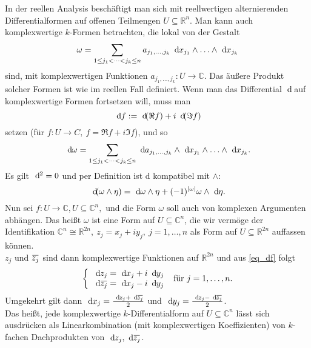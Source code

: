 \documentclass[a4paper,12pt]{book}
\theoremstyle{newthm}
\theoremstyle{newdef}
\theoremstyle{newrem}
\newcommand{\R}{\mathbb{R}}
\newcommand{\C}{\mathbb{C}}
\renewcommand{\d}{\ \operatorname{d}\hspace{-2px}}
\newcommand{\overbar}[1]{\mkern 1.5mu\overline{\mkern-1.5mu#1\mkern-1.5mu}\mkern 1.5mu}
\begin{document}
		In der reellen Analysis beschäftigt man sich mit reellwertigen alternierenden Differentialformen auf offenen Teilmengen $ U \subseteq \R^n $. Man kann auch komplexwertige $k$-Formen betrachten, die lokal von der Gestalt
		\[ \omega = \sum_{1 \leq j_1 < \dots < j_k \leq n} a_{j_1,\dots,j_k} \d x_{j_1} \wedge \dotsc \wedge \d x_{j_k} \]
		sind, mit komplexwertigen Funktionen $ a_{j_1,\dots,j_k}: U \to \C $. Das äußere Produkt solcher Formen ist wie im reellen Fall definiert. Wenn man das Differential $\d$ auf komplexwertige Formen fortsetzen will, muss man 
		\begin{equation}\label{eq_df}
			\d f := \d (\Re f) + i \d (\Im f)
		\end{equation}
		 setzen (für $ f: U \to C,\ f = \Re f + i \Im f $), und so 
		\[ \d \omega = \sum_{1 \leq j_1 < \dots < j_k \leq n} \d a_{j_1,\dotsc,j_k} \wedge \d x_{j_1} \wedge \dotsc \wedge \d x_{j_k}. \]
		Es gilt $ \d^2 = 0 $ und per Definition ist d kompatibel mit $\wedge$: 
		$$ \d(\omega \wedge \eta) = \d \omega \wedge \eta + (-1)^{|\omega|} \omega\wedge \d \eta. $$
		Nun sei $ f: U \to \C, U \subseteq \C^n, $ und die Form $\omega$	soll auch von komplexen Argumenten abhängen. Das heißt $\omega$ ist eine Form auf $ U \subseteq \C^n $, die wir vermöge der Identifikation $ \C^n \cong \R^{2n},\ z_j = x_j + iy_j,\ j=1,\dotsc,n $ als Form auf $ U \subseteq \R^{2n} $ auffassen können.\\
		$ z_j $ und $ \overbar{z_j} $ sind dann komplexwertige Funktionen auf $ \R^{2n} $ und aus \ref{eq_df} folgt
		\[
		\left\{\begin{array}{ll}
			\d z_j = \d x_j + i \d y_j\\
			\d\overbar{z_j} = \d x_j - i \d y_j
		\end{array} \right.\ \text{für } j=1,\dotsc,n.
		\]
		Umgekehrt gilt dann $ \d x_j = \frac{\d z_j + \d\overbar{z_j}}{2} $ und $ \d y_j = \frac{\d z_j - \d\overbar{z_j}}{2} $.\\
		Das heißt, jede komplexwertige $k$-Differentialform auf $ U \subseteq \C^n $ lässt sich ausdrücken als Linearkombination (mit komplexwertigen Koeffizienten) von $k$-fachen Dachprodukten von $ \d z_j, \d \overbar{z_j} $.
		
\end{document}
